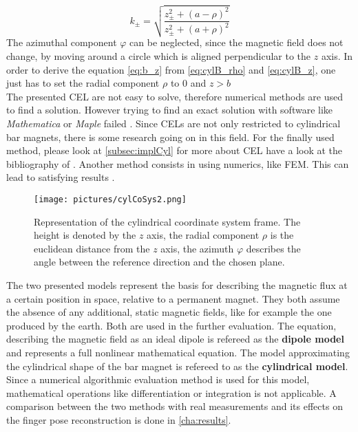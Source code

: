 \begin{equation*}
k_{\pm} = \sqrt{\frac{z_{\pm}^2 + (a-\rho)^2}{z_{\pm}^2 + (a+\rho)^2}}
\end{equation*}
The azimuthal component $ \varphi $ can be neglected, since the magnetic field does not change, by moving around a circle which is aligned perpendicular to the $ z $ axis. In order to derive the equation \ref{eq:b_z} from \ref{eq:cylB_rho} and \ref{eq:cylB_z}, one just has to set the radial component $ \rho $ to 0 and $ z > b $\\
The presented \ac{CEL} are not easy to solve, therefore numerical methods are used to find a solution. However trying to find an exact solution with software like \textit{Mathematica} or \textit{Maple} failed \cite{camacho2013alternative}. Since \acp{CEL} are not only restricted to cylindrical bar magnets, there is some research going on in this field. For the finally used method, please look at \ref{subsec:implCyl} for more about \ac{CEL} have a look at the bibliography of \cite{derby2010cylindrical}. Another method consists in using numerics, like \ac{FEM}. This can lead to satisfying results \cite{mladenovic2009magnetic}.
\begin{figure}
\centering
\texttt{[image: pictures/cylCoSys2.png]}
\caption[Cylindrical coordinate frame]{Representation of the cylindrical coordinate system frame. The height is denoted by the $ z $ axis, the radial component $ \rho $ is the euclidean distance from the $ z $ axis, the azimuth $ \varphi $ describes the angle between the reference direction and the chosen plane. \cite{derby2010cylindrical}}
\label{fig:cylCoSys}
\end{figure}
The two presented models represent the basis for describing the magnetic flux at a certain position in space, relative to a permanent magnet. They both assume the absence of any additional, static magnetic fields, like for example the one produced by the earth. Both are used in the further evaluation. The equation, describing the magnetic field as an ideal dipole is refereed as the \textbf{dipole model} and represents a full nonlinear mathematical equation. The model approximating the cylindrical shape of the bar magnet is refereed to as the \textbf{cylindrical model}. Since a numerical algorithmic evaluation method is used for this model, mathematical operations like differentiation or integration is not applicable. A comparison between the two methods with real measurements and its effects on the finger pose reconstruction is done in \ref{cha:results}.

